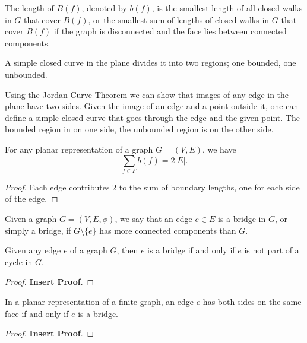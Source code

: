 \documentclass[10pt, a4paper]{article}
\begin{document}
\begin{definition}
    The length of $B(f)$,
    denoted by $b(f)$,
    is the smallest length of all closed walks in $G$ that cover $B(f)$,
    or the smallest sum of lengths of closed walks in $G$ that cover $B(f)$ if the graph is disconnected and the face lies between connected components.
\end{definition}

\begin{theorem}
    A simple closed curve in the plane divides it into two regions;
    one bounded,
    one unbounded.
\end{theorem}

Using the Jordan Curve Theorem we can show that images of any edge in the plane have two sides.
Given the image of an edge and a point outside it,
one can define a simple closed curve that goes through the edge and the given point.
The bounded region in on one side,
the unbounded region is on the other side.

\begin{lemma}
    For any planar representation of a graph $G = (V, E)$,
    we have
    \[
    \sum_{f \in F}b(f) = 2|E|.
    \]
    \begin{proof}
        Each edge contributes $2$ to the sum of boundary lengths,
        one for each side of the edge.
    \end{proof}
\end{lemma}

\begin{definition}[Bridge]
    Given a graph $G = (V, E, \phi)$,
    we say that an edge $e \in E$ is a bridge in $G$,
    or simply a bridge,
    if $G \setminus \{e\}$ has more connected components than $G$.
\end{definition}

\begin{lemma}
    Given any edge $e$ of a graph $G$,
    then $e$ is a bridge if and only if $e$ is not part of a cycle in $G$.
    \begin{proof}
        \textbf{Insert Proof}.
    \end{proof}
\end{lemma}

\begin{corollary}
    In a planar representation of a finite graph,
    an edge $e$ has both sides on the same face if and only if $e$ is a bridge.
    \begin{proof}
        \textbf{Insert Proof}.
    \end{proof}
\end{corollary}
\end{document}
